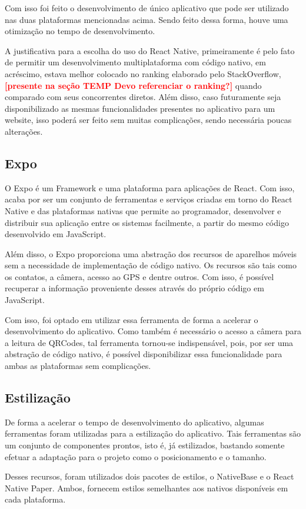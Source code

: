 Com isso foi feito o desenvolvimento de único aplicativo que pode ser utilizado nas duas plataformas mencionadas acima. Sendo feito dessa forma, houve uma otimização no tempo de desenvolvimento.

A justificativa para a escolha do uso do React Native, primeiramente é pelo fato de permitir um desenvolvimento multiplataforma com código nativo, em acréscimo, estava melhor colocado no ranking elaborado pelo StackOverflow, \textcolor{red}{\textbf{[presente na seção {TEMP} Devo referenciar o ranking?]}} quando comparado com seus concorrentes diretos. Além disso, caso futuramente seja disponibilizado as mesmas funcionalidades presentes no aplicativo para um website, isso poderá ser feito sem muitas complicações, sendo necessária poucas alterações.

\subsection{Expo}

O Expo é um Framework e uma plataforma para aplicações de React. Com isso, acaba por ser um conjunto de ferramentas e serviços criadas em torno do React Native e das plataformas nativas que permite ao programador, desenvolver e distribuir sua aplicação entre os sistemas facilmente, a partir do mesmo código desenvolvido em JavaScript.

Além disso, o Expo proporciona uma abstração dos recursos de aparelhos móveis sem a necessidade de implementação de código nativo. Os recursos são tais como os contatos, a câmera, acesso ao GPS e dentre outros. Com isso, é possível recuperar a informação proveniente desses através do próprio código em JavaScript.

Com isso, foi optado em utilizar essa ferramenta de forma a acelerar o desenvolvimento do aplicativo. Como também é necessário o acesso a câmera para a leitura de QRCodes, tal ferramenta tornou-se indispensável, pois, por ser uma abstração de código nativo, é possível disponibilizar essa funcionalidade para ambas as plataformas sem complicações.


\subsection{Estilização}

De forma a acelerar o tempo de desenvolvimento do aplicativo, algumas ferramentas foram utilizadas para a estilização do aplicativo. Tais ferramentas são um conjunto de componentes prontos, isto é, já estilizados, bastando somente efetuar a adaptação para o projeto como o posicionamento e o tamanho.

Desses recursos, foram utilizados dois pacotes de estilos, o NativeBase e o React Native Paper. Ambos, fornecem estilos semelhantes aos nativos disponíveis em cada plataforma.


